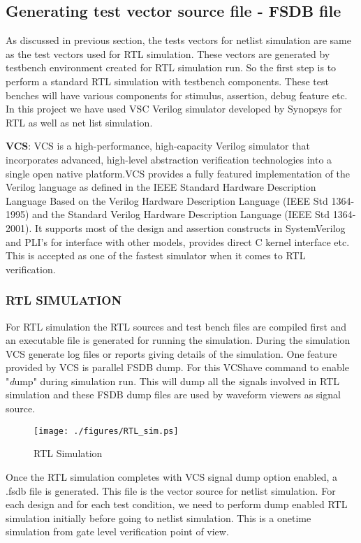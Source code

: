 \subsection{Generating test vector source file - FSDB file}
As discussed in previous section, the tests vectors for netlist simulation are same as the test vectors used for RTL simulation. These vectors are generated by testbench environment created for RTL simulation run. So the first step is to perform a standard RTL simulation with testbench components. These test benches will have various components for stimulus, assertion, debug feature etc. In this project we have used VSC Verilog simulator developed by Synopsys for RTL as well as net list simulation. 

{\bf VCS}: VCS is a high-performance, high-capacity Verilog simulator that  incorporates advanced, high-level abstraction verification  technologies into a single open native platform.VCS provides a fully featured implementation of the Verilog language as defined in the IEEE Standard Hardware Description Language Based on the Verilog Hardware Description Language (IEEE Std 1364-1995) and the Standard Verilog Hardware Description Language (IEEE Std 1364-2001). It supports most of the design and assertion constructs in SystemVerilog and PLI's for interface with other models, provides direct C kernel interface etc.  This is accepted as one of the fastest simulator when it comes to RTL verification. 

\subsubsection{RTL SIMULATION}

For RTL simulation the RTL sources and test bench files are compiled first and an executable file is generated for running the simulation. During the simulation VCS generate log files or reports giving details of the simulation. One feature provided by VCS is parallel FSDB dump. For this VCShave command to enable "{\emph dump}" during simulation run. This will dump all the {\emph signals} involved in RTL simulation and these FSDB dump files are used by waveform viewers as signal source.

\begin{figure}[H]
\centering
\texttt{[image: ./figures/RTL\_sim.ps]}
\caption{RTL Simulation}
\label{fig:RTL_sim.eps}
\end{figure}



Once the RTL simulation completes with VCS signal dump option enabled, a .fsdb file is generated. This file is the vector source for netlist simulation. For each design and for each test condition, we need to perform dump enabled RTL simulation initially before going to netlist simulation. This is a onetime simulation from gate level verification point of view.


